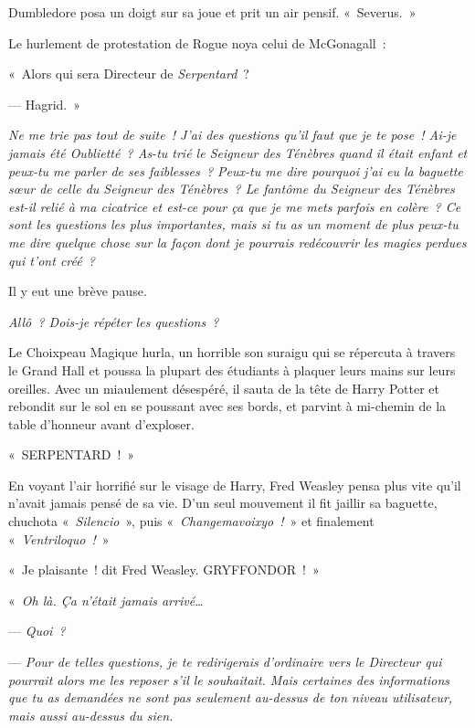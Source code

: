 Dumbledore posa un doigt sur sa joue et prit un air pensif. «~Severus.~»

Le hurlement de protestation de Rogue noya celui de McGonagall~:

«~Alors qui sera Directeur de \emph{Serpentard}~?

--- Hagrid.~»

\later

\emph{Ne me trie pas tout de suite~! J'ai des questions qu'il faut que je te pose~! Ai-je jamais été Oublietté~? As-tu trié le Seigneur des Ténèbres quand il était enfant et peux-tu me parler de ses faiblesses~? Peux-tu me dire pourquoi j'ai eu la baguette sœur de celle du Seigneur des Ténèbres~? Le fantôme du Seigneur des Ténèbres est-il relié à ma cicatrice et est-ce pour ça que je me mets parfois en colère~? Ce sont les questions les plus importantes, mais si tu as un moment de plus peux-tu me dire quelque chose sur la façon dont je pourrais redécouvrir les magies perdues qui t'ont créé~?}

Il y eut une brève pause.

\emph{Allô~? Dois-je répéter les questions~?}

Le Choixpeau Magique hurla, un horrible son suraigu qui se répercuta à travers le Grand Hall et poussa la plupart des étudiants à plaquer leurs mains sur leurs oreilles. Avec un miaulement désespéré, il sauta de la tête de Harry Potter et rebondit sur le sol en se poussant avec ses bords, et parvint à mi-chemin de la table d'honneur avant d'exploser.

\later

«~SERPENTARD~!~»

En voyant l'air horrifié sur le visage de Harry, Fred Weasley pensa plus vite qu'il n'avait jamais pensé de sa vie. D'un seul mouvement il fit jaillir sa baguette, chuchota «~\emph{Silencio}~», puis «~\emph{Changemavoixyo~!}~» et finalement «~\emph{Ventriloquo~!}~»

«~Je plaisante~! dit Fred Weasley. GRYFFONDOR~!~»

\later

«~\emph{Oh là. Ça n'était jamais arrivé…}

--- \emph{Quoi~?}

--- \emph{Pour de telles questions, je te redirigerais d'ordinaire vers le Directeur qui pourrait alors me les reposer s'il le souhaitait. Mais certaines des informations que tu as demandées ne sont pas seulement au-dessus de ton niveau utilisateur, mais aussi au-dessus du sien.}

